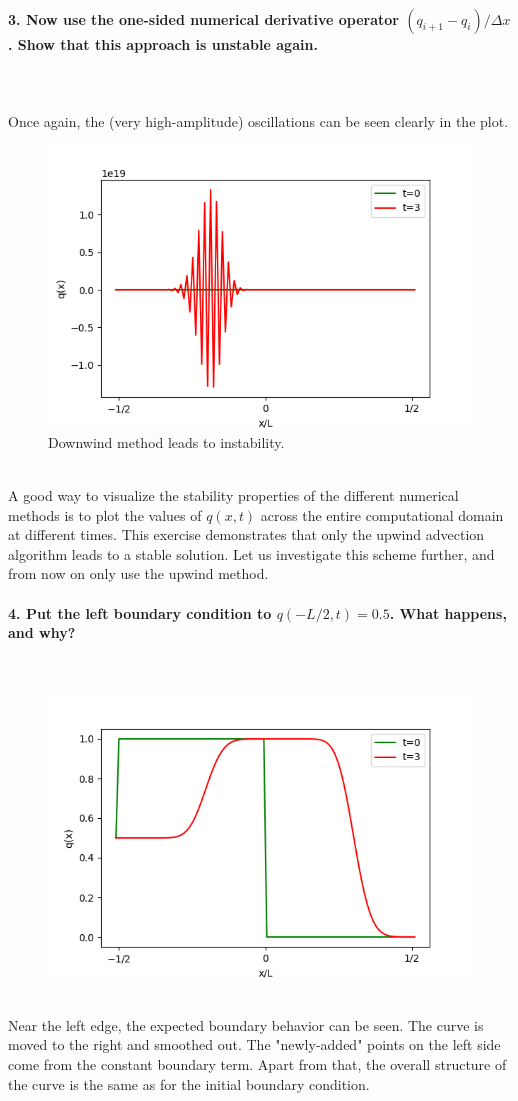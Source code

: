 \paragraph{3. Now use the one-sided numerical derivative 
    operator $(q_{i+1}-q_i)/\Delta x$. Show that this 
    approach is unstable again.
} \ \\
    \\
    Once again, the (very high-amplitude)
    oscillations can be seen 
    clearly in the plot.
    \begin{figure}[h!]
        \centering
        \includegraphics[width=.6\textwidth]{../figures/downwind_3.png}
        \caption{Downwind method leads to instability.}
    \end{figure} \ \\ 

\newpage \noindent
A good way to visualize the stability properties of the 
different numerical methods is to plot the values of 
$q(x,t)$ across the entire computational domain at 
different times. This exercise demonstrates that only the 
upwind advection algorithm leads to a stable solution.
Let us investigate this scheme further, and from now on 
only use the upwind method.

\paragraph{4. Put the left boundary condition to 
    $q(-L/2,t)=0.5$. What happens, and why?
} \ \\
    \begin{figure}[h!]
        \centering
        \includegraphics[width=.6\textwidth]{../figures/upwind_4.png}
    \end{figure} \ \\ 
    Near the left edge, the expected boundary 
    behavior can be seen. The curve is moved to 
    the right and smoothed out. The "newly-added"
    points on the left side come from the  
    constant boundary term. Apart from that, the 
    overall structure of the curve is the same as 
    for the initial boundary condition. 

